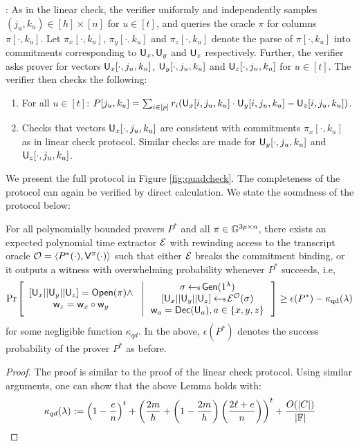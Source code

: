 : As in the linear check, the
verifier uniformly and independently samples $(j_u,k_u)\in [h]\times [n]$ for
$u\in [t]$, and queries the oracle $\pi$ for columns $\pi[\cdot,k_u]$. Let
$\pi_x[\cdot,k_u]$, $\pi_y[\cdot,k_u]$ and $\pi_z[\cdot,k_u]$ denote the parse
of $\pi[\cdot,k_u]$ into commitments corresponding to $\mathsf{U}_x,\mathsf{U}_y$ and
$\mathsf{U}_z$ respectively. Further, the verifier asks prover for vectors
$\mathsf{U}_x[\cdot,j_u,k_u]$, $\mathsf{U}_y[\cdot,j_u,k_u]$ and $\mathsf{U}_z[\cdot,j_u,k_u]$
for $u\in [t]$. The verifier then checks the following:
\begin{enumerate}[{\rm (i)}]
\item For all $u\in [t]$: $P[j_u,k_u]=\sum_{i\in
[p]}r_i(\mathsf{U}_x[i,j_u,k_u]\cdot\mathsf{U}_y[i,j_u,k_u]-\mathsf{U}_z[i,j_u,k_u])$.
\item Checks that vectors $\mathsf{U}_x[\cdot,j_u,k_u]$ are consistent with
commitments $\pi_x[\cdot,k_u]$ as in linear check protocol. Similar checks are
made for $\mathsf{U}_y[\cdot,j_u,k_u]$ and $\mathsf{U}_z[\cdot,j_u,k_u]$.
\end{enumerate}
We present the full protocol in Figure \ref{fig:quadcheck}. The completeness of
the protocol can again be verified by direct calculation. We state the soundness
of the protocol below:

\begin{lemma}[Soundness]\label{lem:quadcheck_sound}
For all polynomially bounded provers $P^\ast$ and all $\pi\in \mathbb{G}^{3p\times n}$,
there exists an expected polynomial time extractor $\mathcal{E}$ with rewinding access
to the transcript oracle $\mathcal{O}=\langle P^\ast(\cdot),\mathsf{V}^{\pi}(\cdot)\rangle$
such that either $\mathcal{E}$ breaks the commitment binding, or it outputs a witness
with overwhelming probability whenever $P^\ast$ succeeds, i.e,
{\small
\begin{align*}
\condprob{
\begin{array}{c}
{[}\ewit_x||\ewit_y||\ewit_z{]}=\open(\pi)\wedge \\
\wit_z=\wit_x\circ\wit_y
\end{array}
}{
\begin{array}{c}
\sigma\sample \gen(\secparam) \\
{[}\ewit_x||\ewit_y||\ewit_z{]}\sample \extr^{\mc{O}}(\sigma)\\
\wit_a=\dec(\ewit_a), a\in \{x,y,z\}
\end{array}
}\geq \epsilon(P^\ast) - \kappa_{\rm qd}(\secpar)
\end{align*}
}
for some negligible function $\kappa_{qd}$. In the above, $\epsilon(P^\ast)$
denotes the success probability of the prover $P^\ast$ as before.
\end{lemma}
\begin{proof}
The proof is similar to the proof of the linear check protocol. Using similar
arguments, one can show that the above Lemma holds with:
{\small
\begin{equation*}
\kappa_{qd}(\lambda) := \left(1-\frac{e}{n}\right)^t +
\left(\frac{2m}{h}+\left(1-\frac{2m}{h}\right)\left(\frac{2\ell+e}{n}\right)\right)^t
+ \frac{O(|C|)}{|\mathbb{F}|}
\end{equation*}
}
\end{proof}

